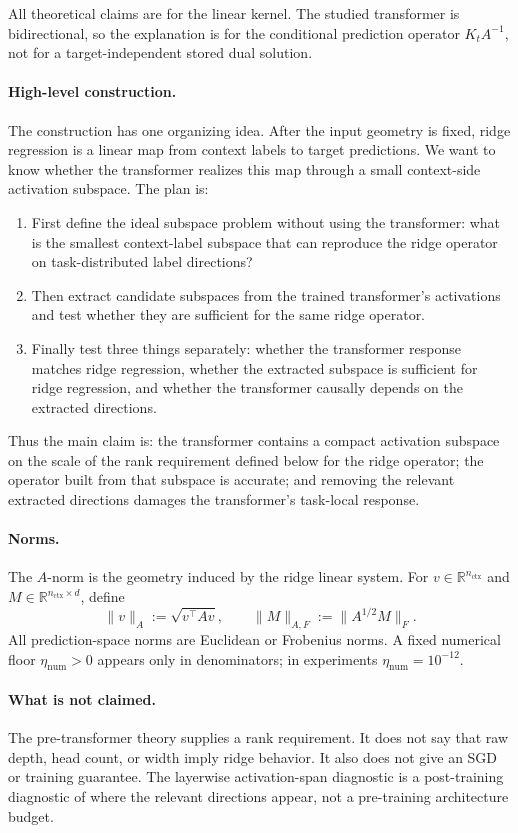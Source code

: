 \documentclass[11pt]{article}
\newcommand{\R}{\mathbb{R}}
\begin{document}
All theoretical claims are for the linear kernel. The studied transformer is bidirectional, so the
explanation is for the conditional prediction operator \(K_tA^{-1}\), not for a target-independent
stored dual solution.

\paragraph{High-level construction.}
The construction has one organizing idea. After the input geometry is fixed, ridge regression is a
linear map from context labels to target predictions. We want to know whether the transformer
realizes this map through a small context-side activation subspace. The plan is:
\begin{enumerate}[label=\arabic*.]
\item First define the ideal subspace problem without using the transformer: what is the smallest
context-label subspace that can reproduce the ridge operator on task-distributed label directions?
\item Then extract candidate subspaces from the trained transformer's activations and test whether
they are sufficient for the same ridge operator.
\item Finally test three things separately: whether the transformer response matches ridge regression,
whether the extracted subspace is sufficient for ridge regression, and whether the transformer
causally depends on the extracted directions.
\end{enumerate}
Thus the main claim is: the transformer contains a compact activation subspace on the scale of the
rank requirement defined below for the ridge operator; the operator built from that subspace is
accurate; and removing the relevant extracted directions damages the transformer's task-local
response.

\paragraph{Norms.}
The \(A\)-norm is the geometry induced by the ridge linear system. For \(v\in\R^{n_{\mathrm{ctx}}}\)
and \(M\in\R^{n_{\mathrm{ctx}}\times d}\), define
\[
\|v\|_A:=\sqrt{v^\top Av},\qquad
\|M\|_{A,F}:=\|A^{1/2}M\|_F.
\]
All prediction-space norms are Euclidean or Frobenius norms. A fixed numerical floor
\(\eta_{\mathrm{num}}>0\) appears only in denominators; in experiments \(\eta_{\mathrm{num}}=10^{-12}\).

\paragraph{What is not claimed.}
The pre-transformer theory supplies a rank requirement. It does not say that raw depth, head
count, or width imply ridge behavior. It also does not give an SGD or training guarantee. The
layerwise activation-span diagnostic is a post-training diagnostic of where the relevant directions
appear, not a pre-training architecture budget.
\end{document}
